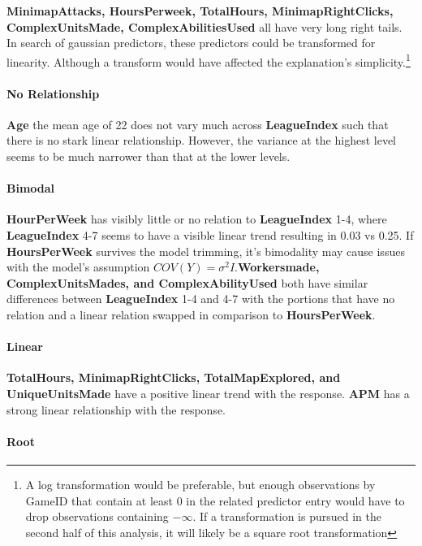 \documentclass[]{article}
\let\oldparagraph\paragraph
\renewcommand{\paragraph}[1]{\oldparagraph{#1}\mbox{}}
\begin{document}
\textbf{MinimapAttacks, HoursPerweek, TotalHours, MinimapRightClicks,
ComplexUnitsMade, ComplexAbilitiesUsed} all have very long right tails.
In search of gaussian predictors, these predictors could be transformed
for linearity. Although a transform would have affected the
explanation's simplicity.\footnote{A log transformation would be
  preferable, but enough observations by GameID that contain at least 0
  in the related predictor entry would have to drop observations
  containing \(-\infty\). If a transformation is pursued in the second
  half of this analysis, it will likely be a square root transformation}

\hypertarget{no-relationship}{%
\paragraph{No Relationship}\label{no-relationship}}

\textbf{Age} the mean age of 22 does not vary much across
\textbf{LeagueIndex} such that there is no stark linear relationship.
However, the variance at the highest level seems to be much narrower
than that at the lower levels.

\hypertarget{bimodal}{%
\paragraph{Bimodal}\label{bimodal}}

\textbf{HourPerWeek} has visibly little or no relation to
\textbf{LeagueIndex} 1-4, where \textbf{LeagueIndex} 4-7 seems to have a
visible linear trend resulting in 0.03 vs 0.25. If \textbf{HoursPerWeek}
survives the model trimming, it's bimodality may cause issues with the
model's assumption \(COV(Y)=\sigma^2I\).\textbf{Workersmade,
ComplexUnitsMades, and ComplexAbilityUsed} both have similar differences
between \textbf{LeagueIndex} 1-4 and 4-7 with the portions that have no
relation and a linear relation swapped in comparison to
\textbf{HoursPerWeek}.

\hypertarget{linear}{%
\paragraph{Linear}\label{linear}}

\textbf{TotalHours, MinimapRightClicks, TotalMapExplored, and
UniqueUnitsMade} have a positive linear trend with the response.
\textbf{APM} has a strong linear relationship with the response.

\hypertarget{root}{%
\paragraph{Root}\label{root}}
\end{document}
